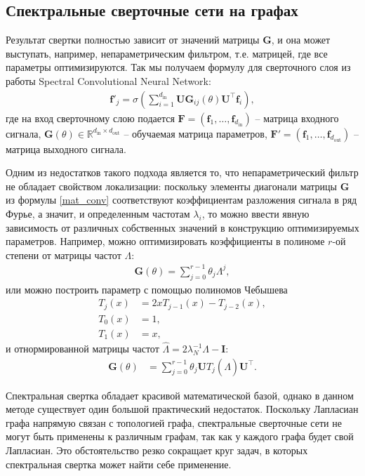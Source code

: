 \documentclass[]{article}
\let\v\mathbf
\begin{document}
\subsection*{Спектральные сверточные сети на графах}

Результат свертки полностью зависит от значений матрицы $\v{G}$, и она может выступать, например, непараметрическим фильтром, т.е. матрицей, где все параметры оптимизируются. Так мы получаем формулу для сверточного слоя из работы Spectral Convolutional Neural Network\cite{bruna2013spectral}:
\begin{align}
    \v{f}'_{j}=\sigma\left(\sum_{i=1}^{d_{\text{in}}}\v{U}\v{G}_{ij}(\theta)\v{U}^{\top}\v{f}_{i}\right),
\end{align}
где на вход сверточному слою подается $\v{F}=(\v{f}_1,\dots,\v{f}_{d_{\text{in}}})$ -- матрица входного сигнала, $\v{G}(\theta)\in\mathbb{R}^{d_{\text{in}}\times{d_{\text{out}}}}$ -- обучаемая матрица параметров, $\v{F}'=(\v{f}_1,\dots,\v{f}_{d_{\text{out}}})$ -- матрица выходного сигнала.

Одним из недостатков такого подхода является то, что непараметрический фильтр не обладает свойством локализации: поскольку элементы диагонали матрицы $\v{G}$ из формулы \eqref{mat_conv} соответствуют коэффициентам разложения сигнала в ряд Фурье, а значит, и определенным частотам $\lambda_i$, то можно ввести явную зависимость от различных собственных значений в конструкцию оптимизируемых параметров. Например, можно оптимизировать коэффициенты в полиноме $r$-ой степени от матрицы частот $\Lambda$:
\begin{align}
    \v{G}(\theta)=\sum_{j=0}^{r-1}\theta_j\Lambda^j,
\end{align}
или можно построить параметр с помощью полиномов Чебышева\cite{defferrard2016convolutional}
\begin{align}
    T_j(x)&=2xT_{j-1}(x)-T_{j-2}(x),\\
    T_0(x)&=1,\\
    T_1(x)&=x,
\end{align}
и отнормированной матрицы частот $\hat\Lambda=2\lambda_N^{-1}\Lambda-\v{I}$:
\begin{align}
    \v{G}(\theta)&=\sum_{j=0}^{r-1}\theta_j\v{U}T_j(\hat\Lambda)\v{U}^{\top}.
\end{align}

Спектральная свертка обладает красивой математической базой, однако в данном методе существует один большой практический недостаток. Поскольку Лапласиан графа напрямую связан с топологией графа, спектральные сверточные сети не могут быть применены к различным графам, так как у каждого графа будет свой Лапласиан. Это обстоятельство резко сокращает круг задач, в которых спектральная свертка может найти себе применение.
\end{document}
